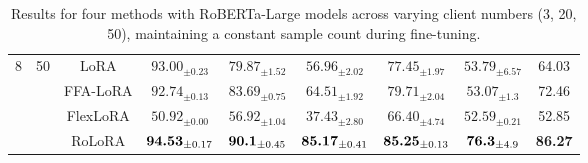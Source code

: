 \documentclass{article}
\theoremstyle{plain}
\theoremstyle{definition}
\theoremstyle{remark}
\begin{document}
\begin{table}[h!]
{\begin{tabular}{ccccccccc}
    \multirow{4}{*}{8} & \multirow{4}{*}{50}
    & LoRA       & $\text{93.00}_{\pm \text{0.23}}$ & $\text{79.87}_{\pm \text{1.52}}$ & $\text{56.96}_{\pm \text{2.02}}$ & $\text{77.45}_{\pm \text{1.97}}$ & $\text{53.79}_{\pm \text{6.57}}$ & 64.03 \\
    &             & FFA-LoRA   & $\text{92.74}_{\pm \text{0.13}}$ & $\text{83.69}_{\pm \text{0.75}}$ & $\text{64.51}_{\pm \text{1.92}}$ & $\text{79.71}_{\pm \text{2.04}}$ & $\text{53.07}_{\pm \text{1.3}}$  & 72.46 \\
    &             & FlexLoRA   & $\text{50.92}_{\pm \text{0.00}}$ & $\text{56.92}_{\pm \text{1.04}}$ & $\text{37.43}_{\pm \text{2.80}}$ & $\text{66.40}_{\pm \text{4.74}}$ & $\text{52.59}_{\pm \text{0.21}}$ & 52.85 \\
    &             & \cellcolor{ours}  RoLoRA & \cellcolor{ours} $\text{\textbf{94.53}}_{\pm \text{0.17}}$ & \cellcolor{ours}  $\text{\textbf{90.1}}_{\pm \text{0.45}}$ & \cellcolor{ours} $\text{\textbf{85.17}}_{\pm \text{0.41}}$ & \cellcolor{ours}  $\text{\textbf{85.25}}_{\pm \text{0.13}}$ & \cellcolor{ours} $\text{\textbf{76.3}}_{\pm \text{4.9}}$  & \cellcolor{ours}  \textbf{86.27} \\
    \bottomrule
\end{tabular}
\vspace{3pt}
\caption{Results for four methods with RoBERTa-Large models across varying client numbers (3, 20, 50), maintaining a constant sample count during fine-tuning.}
\label{tab:Clients-num-flex-appendix}
}
\end{table}
\end{document}
